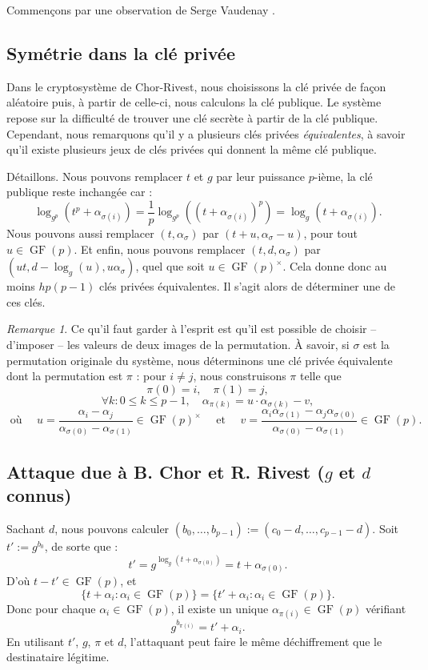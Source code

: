\documentclass[a4paper, titlepage]{article}
\theoremstyle{definition}
\theoremstyle{remark}
\newtheorem{rema}[theo]{Remarque}
\def\gf{\operatorname{GF}}
\begin{document}
Commençons par une observation de Serge Vaudenay \cite[Section 3]{vaudenay2000}.

\subsection{Symétrie dans la clé privée}\label{symetrieClePrivee}

Dans le cryptosystème de Chor-Rivest, nous choisissons la clé privée de façon aléatoire puis, à partir de celle-ci, nous calculons la clé publique. Le système repose sur la difficulté de trouver une clé secrète à partir de la clé publique. Cependant, nous remarquons qu'il y a plusieurs clés privées \textit{équivalentes}, à savoir qu'il existe plusieurs jeux de clés privées qui donnent la même clé publique.

Détaillons. Nous pouvons remplacer $t$ et $g$ par leur puissance $p$-ième, la clé publique reste inchangée car :
$$\log_{g^p}\left(t^p + \alpha_{\sigma(i)}\right) = \frac{1}{p}\log_{g^p}\left(\left(t + \alpha_{\sigma(i)}\right)^p\right) = \log_{g}\left(t + \alpha_{\sigma(i)}\right).$$
Nous pouvons aussi remplacer $(t, \alpha_{\sigma})$ par $(t + u, \alpha_{\sigma} - u)$, pour tout $u \in \gf(p)$. Et enfin, nous pouvons remplacer $(t,d,\alpha_\sigma)$ par $(ut, d - \log_g(u), u\alpha_\sigma)$, quel que soit $u \in \gf(p)^\times$.
Cela donne donc au moins $hp(p-1)$ clés privées équivalentes. Il s'agit alors de déterminer une de ces clés.

\begin{rema}Ce qu'il faut garder à l'esprit est qu'il est possible de choisir -- d'imposer -- les valeurs de deux images de la permutation. \`A savoir, si $\sigma$ est la permutation originale du système, nous déterminons une clé privée équivalente dont la permutation est $\pi$ : pour $i \neq j$, nous construisons $\pi$ telle que
$$\pi(0) = i,\quad \pi(1) = j,$$
$$\forall k : 0\leqslant k \leqslant p-1, \quad 
\alpha_{\pi(k)} = u\cdot\alpha_{\sigma(k)} - v,$$
$$ \text{ où }\quad u = \frac{\alpha_i - \alpha_j}{\alpha_{\sigma(0)}- \alpha_{\sigma(1)}} \in \gf(p)^\times \quad \text{ et } \quad v =  \frac{\alpha_i\alpha_{\sigma(1)} - \alpha_j\alpha_{\sigma(0)}}{\alpha_{\sigma(0)}- \alpha_{\sigma(1)}} \in \gf(p).$$
\end{rema}

\subsection{Attaque due à B. Chor et R. Rivest ($g$ et $d$ connus)}
Sachant $d$, nous pouvons calculer 
$( b_0, \dots, b_{p-1}) := (c_0 -d, \dots, c_{p-1}-d )$.
Soit $t' := g^{b_0}$, de sorte que :
$$t' = g^{\log_g(t+\alpha_{\sigma(0)})} = t + \alpha_{\sigma(0)}.$$
D'où $t-t' \in \gf(p)$, et 
$$\{t + \alpha_i : \alpha_i \in \gf(p)\} = \{t' + \alpha_i : \alpha_i \in \gf(p)\}.$$
Donc pour chaque $\alpha_i \in \gf(p)$, il existe un unique $\alpha_{\pi(i)} \in \gf(p)$ vérifiant 
$$g^{b_{\pi(i)}} =  t' +\alpha_{i}.$$
En utilisant $t'$, $g$, $\pi$ et $d$, l'attaquant peut faire le même déchiffrement que le destinataire légitime.
\end{document}

